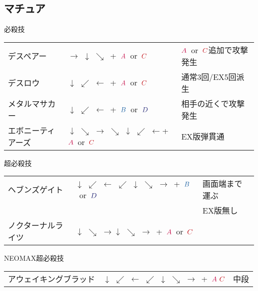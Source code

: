 \documentclass[a4j,11pt]{jarticle}
\def\A{\textcolor{Acolor}{A}}
\def\C{\textcolor{Ccolor}{C}}
\def\B{\textcolor{Bcolor}{B}}
\def\D{\textcolor{Dcolor}{D}}
\def\hado{$\downarrow$ $\searrow$ $\rightarrow$}%
\def\tatsu{$\downarrow$ $\swarrow$ $\leftarrow$}%
\def\syoryu{$\rightarrow$ $\downarrow$ $\searrow$}%
\def\ryuko{$\downarrow$ $\searrow$ $\rightarrow$ $\searrow$ $\downarrow$ $\swarrow$ $\leftarrow$}%
\def\orochi{$\downarrow$ $\swarrow$ $\leftarrow$ $\swarrow$ $\downarrow$ $\searrow$ $\rightarrow$}%
\begin{document}
\subsection{マチュア}
\begin{itembox}[l]{必殺技}
\begin{tabular}{lll}
デスペアー&\syoryu\ +\ $\A$\ or\ $\C$&$\A$\ or\ $\C$追加で攻撃発生\\%
デスロウ&\tatsu\ +\ $\A$\ or\ $\C$&通常3回/EX5回派生\\%
メタルマサカー&\tatsu\ +\ $\B$\ or\ $\D$&相手の近くで攻撃発生\\%
エボニーティアーズ&\ryuko +\ $\A$\ or\ $\C$&EX版弾貫通%
\end{tabular}
\end{itembox}
\begin{itembox}[l]{超必殺技}
\begin{tabular}{lll}
ヘブンズゲイト&\orochi\ +\ $\B$\ or\ $\D$&画面端まで運ぶ\\
&&EX版無し\\ %
ノクターナルライツ&\hado\hado\ +\ $\A$\ or\ $\C$&%
\end{tabular}
\end{itembox}
\begin{itembox}[l]{NEOMAX超必殺技}
\begin{tabular}{lll}
アウェイキングブラッド&\orochi\ +\ $\A\ \C$&中段%
\end{tabular}
\end{itembox}
\newpage
\end{document}
